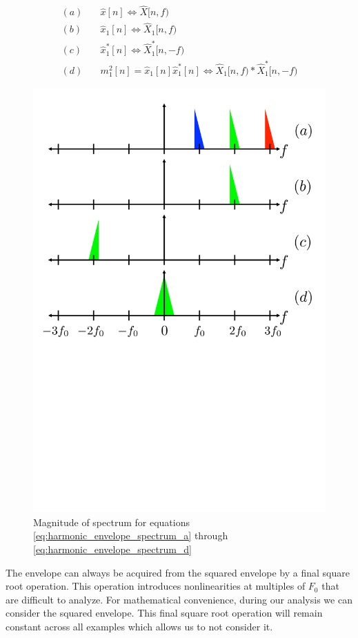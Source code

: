 \documentclass [11pt, proquest] {uwthesis}[2015/03/03]
\begin{document}
\begin{align}
\label{eq:harmonic_envelope_spectrum_a}
(a)& \quad \widehat{x}[n] \Longleftrightarrow \widehat{X}[n,f)  \\
(b)& \quad \widehat{x}_1[n] \Longleftrightarrow \widehat{X}_1[n,f) \\
(c)& \quad \widehat{x}_1^*[n] \Longleftrightarrow \widehat{X}_1^*[n,-f) \\
\label{eq:harmonic_envelope_spectrum_d}
(d)& \quad m_1^2[n] = \widehat{x}_1[n] \widehat{x}_1^*[n] \Longleftrightarrow \widehat{X}_1[n,f) * \widehat{X}_1^*[n,-f)
\end{align}

\begin{figure}[!ht]
\label{fig:harmonic_envelope}
  \centering
    \includegraphics[width=.62\textwidth]{harmonic_envelope}   
        \caption{Magnitude of spectrum for equations \ref{eq:harmonic_envelope_spectrum_a} through \ref{eq:harmonic_envelope_spectrum_d}}
\end{figure}

The envelope can always be acquired from the squared envelope by a final square root operation.  This operation introduces nonlinearities at multiples of $F_0$ that are difficult to analyze.  For mathematical convenience, during our analysis we can consider the squared envelope.  This final square root operation will remain constant across all examples which allows us to not consider it.
\end{document}
